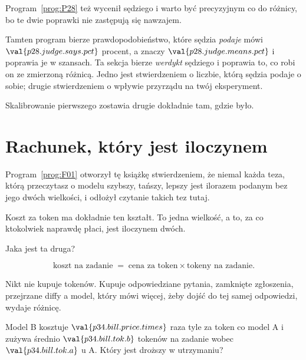 \begin{fr}
Program~\ref{prog:P28} też wycenił sędziego i warto być precyzyjnym co do
różnicy, bo te dwie poprawki nie zastępują się nawzajem.

Tamten program bierze prawdopodobieństwo, które sędzia \emph{podaje} \dash{}
mówi $\val{p28.judge.says.pct}$ procent, a znaczy $\val{p28.judge.means.pct}$
\dash{} i poprawia je w szansach. Ta sekcja bierze \emph{werdykt} sędziego i
poprawia to, co robi on ze zmierzoną różnicą. Jedno jest stwierdzeniem o
liczbie, którą sędzia podaje o sobie; drugie stwierdzeniem o wpływie przyrządu
na twój eksperyment.

Skalibrowanie pierwszego zostawia drugie dokładnie tam, gdzie było.

\end{fr}

\section{Rachunek, który jest iloczynem}
\label{sec:P34-bill}

\begin{fr}
Program~\ref{prog:F01} otworzył tę książkę stwierdzeniem, że niemal każda
teza, którą przeczytasz o modelu \dash{} szybszy, tańszy, lepszy \dash{} jest
ilorazem podanym bez jego dwóch wielkości, i odłożył czytanie takich tez
tutaj.

Koszt za token ma dokładnie ten kształt. To jedna wielkość, a to, za co
ktokolwiek naprawdę płaci, jest iloczynem dwóch.

Jaka jest ta druga?
\dotline
\nextframe
\end{fr}

\begin{fr}

\[ \text{koszt na zadanie} \;=\; \text{cena za token} \times
   \text{tokeny na zadanie} . \]

Nikt nie kupuje tokenów. Kupuje odpowiedziane pytania, zamknięte zgłoszenia,
przejrzane diffy \dash{} a model, który mówi więcej, żeby dojść do tej samej
odpowiedzi, wydaje różnicę.

Model B kosztuje $\val{p34.bill.price.times}$ raza tyle za token co model A i
zużywa średnio $\val{p34.bill.tok.b}$ tokenów na zadanie wobec
$\val{p34.bill.tok.a}$ u A. Który jest droższy w utrzymaniu?
\dotline
\nextframe
\end{fr}

